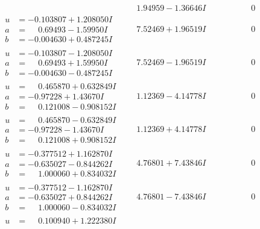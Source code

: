 \documentclass[1p]{elsarticle_modified}
\theoremstyle{definition}
\begin{document}
$$\begin{array}{c|c|c}
 & \phantom{-}1.94959 - 1.36646 I & \phantom{-0.000000 } 0 \\ \hline\begin{aligned}
u &= -0.103807 + 1.208050 I \\
a &= \phantom{-}0.69493 - 1.59950 I \\
b &= -0.004630 + 0.487245 I\end{aligned}
 & \phantom{-}7.52469 + 1.96519 I & \phantom{-0.000000 } 0 \\ \hline\begin{aligned}
u &= -0.103807 - 1.208050 I \\
a &= \phantom{-}0.69493 + 1.59950 I \\
b &= -0.004630 - 0.487245 I\end{aligned}
 & \phantom{-}7.52469 - 1.96519 I & \phantom{-0.000000 } 0 \\ \hline\begin{aligned}
u &= \phantom{-}0.465870 + 0.632849 I \\
a &= -0.97228 + 1.43670 I \\
b &= \phantom{-}0.121008 - 0.908152 I\end{aligned}
 & \phantom{-}1.12369 - 4.14778 I & \phantom{-0.000000 } 0 \\ \hline\begin{aligned}
u &= \phantom{-}0.465870 - 0.632849 I \\
a &= -0.97228 - 1.43670 I \\
b &= \phantom{-}0.121008 + 0.908152 I\end{aligned}
 & \phantom{-}1.12369 + 4.14778 I & \phantom{-0.000000 } 0 \\ \hline\begin{aligned}
u &= -0.377512 + 1.162870 I \\
a &= -0.635027 - 0.844262 I \\
b &= \phantom{-}1.000060 + 0.834032 I\end{aligned}
 & \phantom{-}4.76801 + 7.43846 I & \phantom{-0.000000 } 0 \\ \hline\begin{aligned}
u &= -0.377512 - 1.162870 I \\
a &= -0.635027 + 0.844262 I \\
b &= \phantom{-}1.000060 - 0.834032 I\end{aligned}
 & \phantom{-}4.76801 - 7.43846 I & \phantom{-0.000000 } 0 \\ \hline\begin{aligned}
u &= \phantom{-}0.100940 + 1.222380 I \\

\end{aligned}
\end{array}$$
\end{document}
